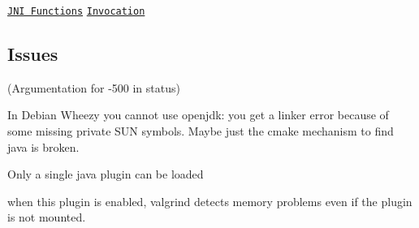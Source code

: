 \href{https://docs.oracle.com/javase/7/docs/technotes/guides/jni/spec/functions.html}{\tt J\+N\+I Functions} \href{https://docs.oracle.com/javase/7/docs/technotes/guides/jni/spec/invocation.html}{\tt Invocation}

\subsection*{Issues}

(Argumentation for -\/500 in status)


\begin{DoxyItemize}
\item In Debian Wheezy you cannot use openjdk\+: you get a linker error because of some missing private S\+U\+N symbols. Maybe just the cmake mechanism to find java is broken.
\item Only a single java plugin can be loaded
\item when this plugin is enabled, valgrind detects memory problems even if the plugin is not mounted. 
\end{DoxyItemize}
